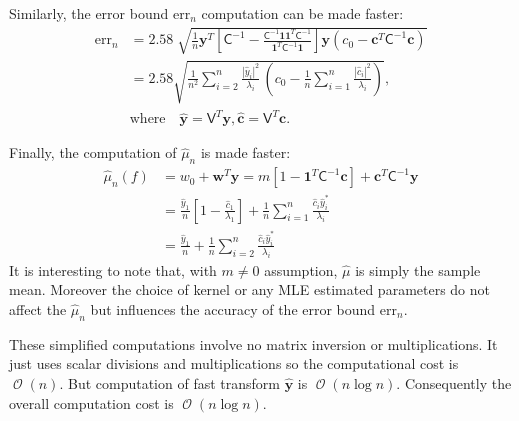 \documentclass[smallextended]{svjour3}       %
\DeclareMathOperator{\Order}{{\mathcal O}}
\newcommand{\bm}[1]{\boldsymbol{#1}}
\newcommand{\vc}{\bm{c}}
\newcommand{\vw}{\bm{w}}
\newcommand{\vy}{\bm{y}}
\newcommand{\vone}{\bm{1}}
\newcommand{\mC}{\mathsf{C}}
\newcommand{\mCInv}{{\mathsf{C}^{-1}}}
\newcommand{\mV}{\mathsf{V}}
\newcommand{\hmu}{\hat{\mu}}
\newcommand{\errn}{\text{err}_{n}}
\def\abs#1{\ensuremath{\left \lvert #1 \right \rvert}}
\begin{document}
Similarly, the error bound {$\errn$} computation can be made faster:
\begin{align*}
\errn &=
2.58 \; \sqrt{ 
\frac{1}{n}
\vy^T 
\left[ 
\mCInv - 
\frac{ \mCInv \vone \vone^T \mCInv }{\vone^T\mCInv \vone}
\right] \vy
(c_0 - \vc^T\mC^{-1}\vc) } 
\\
&
=
{{
\displaystyle
{
2.58\sqrt{
\frac {1}{n^2} \sum_{i=2}^{n} \frac{\abs{\widehat{y}_i}^2}{\lambda_i}  
\,
\left( c_0 - \frac 1n \sum_{i=1}^n \frac{\abs{\widehat{c}_i}^2}{\lambda_i} \right) 
}
}
}}, 
\\
\nonumber
& \text{where} \quad 
\widehat{\vy} = \mV^T \vy,  
\widehat{\vc} = \mV^T \vc. 
\end{align*}




Finally, the computation of $\hmu_n$ is made faster:
\begin{align}
\nonumber
\hmu_n(f) &= w_0 + \vw^T \vy 
= 
m[1 - \vone^T  \mC^{-1}\vc ]
+
\vc^T \mC^{-1} \vy
\\
\nonumber
&= \frac{\widehat{y}_1}{n} \left[1 - \frac{\widehat{c}_1}{\lambda_1}\right]
+ \frac 1n \sum_{i=1}^n \frac{ \widehat{c}_i \widehat{y}_i^*}{\lambda_i}
\\
\label{eqn:hmu_complicated}
& =
 \frac{\widehat{y}_1}{n} +
 \frac 1n \sum_{i=2}^n \frac{ \widehat{c}_i \widehat{y}_i^*}{\lambda_i}
\end{align}
It is interesting to note that, with $m \neq 0$ assumption, $\hmu$ is simply the sample mean. 
Moreover the choice of kernel or any MLE estimated parameters do not affect the $\hmu_n$ but influences the accuracy of the error bound $\errn$.


These simplified computations involve no matrix inversion or multiplications. 
It just uses scalar divisions and multiplications so the computational cost is $\Order(n)$. 
But computation of fast transform $\widehat{\vy}$ is $\Order(n \log n)$.  Consequently the overall computation cost is $\Order(n \log n )$. 
\end{document}
